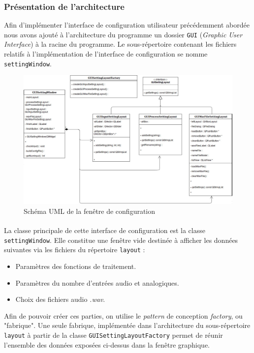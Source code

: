  \subsubsection{Présentation de l'architecture}
 Afin d'implémenter l'interface de configuration utilisateur
 précédemment abordée nous avons ajouté à l'architecture du programme
 un dossier \verb!GUI! (\textit{Graphic User Interface}) à la racine
 du programme.  Le sous-répertoire contenant les fichiers relatifs à
 l'implémentation de l'interface de configuration se nomme
 \verb!settingWindow!.

 \begin{figure}[H]
  \centering
  \includegraphics[scale=0.3]{assets/umlSettingWindow.png}
  \caption{Schéma UML de la fenêtre de configuration}
  \label{schéma global}
 \end{figure}

 \paragraph{}
 La classe principale de cette interface de configuration est la
 classe \verb!settingWindow!. Elle constitue une fenêtre vide destinée
 à afficher les données suivantes via les fichiers du répertoire
 \verb!layout! :
 \begin{itemize}
  \item Paramètres des fonctions de traitement.
  \item Paramètres du nombre d'entrées audio et analogiques.
  \item Choix des fichiers audio \textit{.wav}.
 \end{itemize}
 Afin de pouvoir créer ces parties, on utilise le \textit{pattern} de
 conception \textit{factory}, ou "fabrique". Une seule fabrique,
 implémentée dans l'architecture du sous-répertoire \verb!layout! à
 partir de la classe \verb!GUISettingLayoutFactory! permet de réunir
 l'ensemble des données exposées ci-dessus dans la fenêtre graphique.
